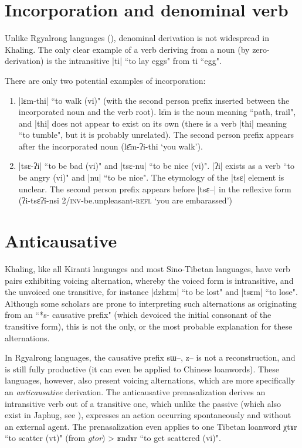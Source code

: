 \documentclass[oldfontcommands,oneside,a4paper,11pt]{article}
\newcommand{\ipa}[1]{{\phon #1}} %
\newcommand{\dhatu}[1]{|\ipa{#1}|}
\begin{document}
\section{Incorporation and denominal verb}
Unlike Rgyalrong languages (\citealt{jacques12incorp}), denominal derivation is not widespread in Khaling. The only clear example of a verb deriving from a noun (by zero-derivation) is the intransitive \dhatu{ti} ``to lay eggs" from \ipa{ti} ``egg".


There are only two potential examples of incorporation:

\begin{enumerate}
\item \dhatu{lɛm-thi} ``to walk (vi)" (with the second person prefix inserted between the incorporated noun and the verb root). \ipa{lɛ̄m} is the noun meaning ``path, trail", and \dhatu{thi} does not appear to exist on its own (there is a verb \dhatu{thi} meaning ``to tumble", but it is probably unrelated). The second person prefix appears after the incorporated noun (\ipa{lɛ̄m-ʔi-thi} `you walk').
\item \dhatu{tsɛ-ʔi} ``to be bad (vi)" and \dhatu{tsɛ-nu} ``to be nice (vi)". \dhatu{ʔi} exists as a verb ``to be angry (vi)" and \dhatu{nu} ``to be nice". The etymology of the \dhatu{tsɛ} element is unclear. The second person prefix appears before |tsɛ--| in the reflexive form (\ipa{ʔi-tsɛʔî-nsi} \textsc{2/inv}-be.unpleasant-\textsc{refl} `you are embarassed')
\end{enumerate}

\section{Anticausative}
Khaling, like all Kiranti languages and most Sino-Tibetan languages, have verb pairs exhibiting voicing alternation, whereby the voiced form is intransitive, and the unvoiced one transitive, for instance \dhatu{dzhɛm} ``to be lost" and \dhatu{tsɛm} ``to lose". Although some scholars are prone to interpreting such alternations as originating from an ``*s- causative prefix" (which devoiced the initial consonant of the transitive form), this is not the only, or the most probable explanation for these alternations.

In Rgyalrong languages, the causative prefix \ipa{sɯ--, z--} is not a reconstruction, and is still fully productive (it can even be applied to Chinese loanwords). These languages, however, also present voicing alternations, which are more specifically an \textit{anticausative} derivation. The anticausative prenasalization derives an intransitive verb out of a transitive one, which unlike the passive (which also exist in Japhug, see \citealt{jacques12demotion}), expresses an action occurring spontaneously and without an external agent. The prenasalization even applies to one Tibetan loanword \ipa{χtɤr} ``to scatter (vt)" (from \textit{gtor}) > \ipa{ʁndɤr} ``to get scattered (vi)".
\end{document}
